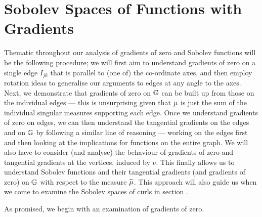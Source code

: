 \section{Sobolev Spaces of Functions with Gradients} \label{sec:3DGradSobSpaces}


Thematic throughout our analysis of gradients of zero and Sobolev functions will be the following procedure; we will first aim to understand gradients of zero on a single edge $I_{jk}$ that is parallel to (one of) the co-ordinate axes, and then employ rotation ideas to generalise our arguments to edges at any angle to the axes.
Next, we demonstrate that gradients of zero on $\mathbb{G}$ can be built up from those on the individual edges --- this is unsurprising given that $\mu$ is just the sum of the individual singular measures supporting each edge.
Once we understand gradients of zero on edges, we can then understand the tangential gradients on the edges and on $\mathbb{G}$ by following a similar line of reasoning --- working on the edges first and then looking at the implications for functions on the entire graph.
We will also have to consider (and analyse) the behaviour of gradients of zero and tangential gradients at the vertices, induced by $\nu$.
This finally allows us to understand Sobolev functions and their tangential gradients (and gradients of zero) on $\mathbb{G}$ with respect to the measure $\widetilde{\mu}$.
This approach will also guide us when we come to examine the Sobolev spaces of curls in section .

As promised, we begin with an examination of gradients of zero. 


